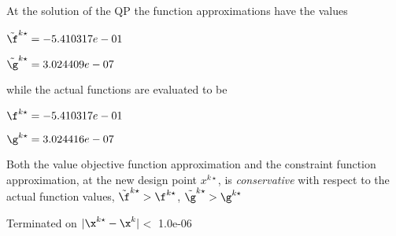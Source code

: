 At the solution of the QP the function approximations have the values

$\tilde \f^{k\star} = -5.410317e-01$

$\tilde \g^{k\star} =  3.024409e-07$

\bigskip
while the actual functions are evaluated to be

$\f^{k\star} = -5.410317e-01$

$\g^{k\star} =  3.024416e-07$

\bigskip 
 Both the value objective function approximation                         and the constraint function approximation, at the new design point                         $x^{k\star}$, is \emph{conservative} with respect to the actual function                         values, $\tilde {\f}^{k\star} > {\f}^{k\star}$,                         $\tilde {\g}^{k\star} > {\g}^{k\star}$ 



\bigskip Terminated on $|\x^{k\star}-\x^{k}|$$<$ 1.0e-06
